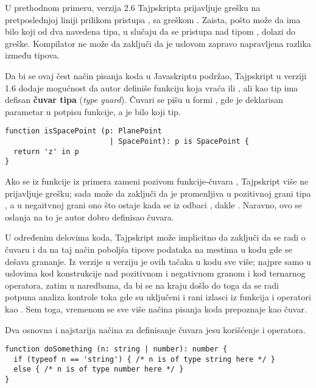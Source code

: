 U prethodnom primeru, verzija 2.6 Tajpskripta prijavljuje grešku na pretposlednjoj liniji prilikom pristupa , sa greškom .
Zaista, pošto  može da ima bilo koji od dva navedena tipa, u slučaju da se pristupa  nad tipom , dolazi do greške.
Kompilator ne može da zaključi da je uslovom  zapravo napravljena razlika između tipova.

Da bi se ovaj čest način pisanja koda u Javaskriptu podržao, Tajpskript u verziji 1.6 dodaje mogućnost da autor definiše funkciju koja vraća  ili , ali kao tip ima defisan \textbf{čuvar tipa} (\textsl{type guard}).
Čuvari se pišu u formi , gde je  deklarisan parametar u potpisu funkcije, a  je bilo koji tip.

\begin{verbatim}
function isSpacePoint (p: PlanePoint
                        | SpacePoint): p is SpacePoint {
  return 'z' in p
}
\end{verbatim}

Ako se  iz funkcije  iz primera zameni pozivom funkcije-čuvara , Tajpskript više ne prijavljuje grešku; sada može da zaključi da je promenljiva  u pozitivnoj grani tipa , a u negaitvnoj grani ono što ostaje kada se iz  odbaci , dakle .
Naravno, ovo se oslanja na to je autor dobro definisao čuvara.

U određenim delovima koda, Tajpskript može implicitno da zaključi da se radi o čuvaru i da na taj način poboljša tipove podataka na mestima u kodu gde se dešava grananje.
Iz verzije u verziju je ovih tačaka u kodu sve više; najpre samo u uslovima kod  konstrukcije nad pozitivnom i negativnom granom i kod ternarnog operatora, zatim u  naredbama, da bi se na kraju došlo do toga da se radi potpuna analiza kontrole toka gde su uključeni i rani izlasci iz funkcija i operatori kao .
Sem toga, vremenom se sve više načina pisanja koda prepoznaje kao čuvar.

Dva osnovna i najstarija načina za definisanje čuvara jesu korišćenje  i  operatora.

\begin{verbatim}
function doSomething (n: string | number): number {
  if (typeof n == 'string') { /* n is of type string here */ }
  else { /* n is of type number here */ }
}
\end{verbatim}

